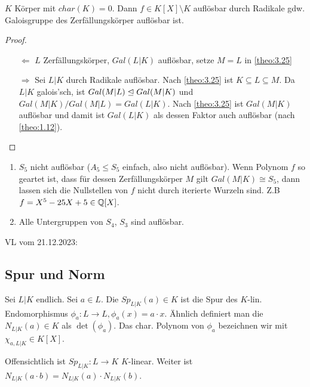 \documentclass[../main.tex]{subfiles}
\begin{document}
\begin{corollary}
    $K$ Körper mit $char(K)=0$. Dann $f\in K[X]\setminus K$ auflösbar durch Radikale gdw. Galoisgruppe des Zerfällungskörper auflösbar ist.
\end{corollary}
\begin{proof} $ $
    \begin{itemize}
        \item[$\Leftarrow$]
        $L$ Zerfällungskörper, $Gal(L|K)$ auflösbar, setze $M=L$ in \ref{theo:3.25}
        \item[$\Rightarrow$]
        Sei $L|K$ durch Radikale auflösbar.
        Nach \ref{theo:3.25} ist $K\subseteq L \subseteq M$.
        Da $L|K$ galois'sch, ist $Gal(M|L)\trianglelefteq Gal(M|K)$ und $Gal(M|K)/Gal(M|L) = Gal(L|K)$.
        Nach \ref{theo:3.25} ist $Gal(M|K)$ auflösbar und damit ist $Gal(L|K)$ als dessen Faktor auch auflösbar (nach \ref{theo:1.12}).
    \end{itemize}
\end{proof}

\begin{example}
    \begin{enumerate}
        \item $S_5$ nicht auflösbar ($A_5 \leq S_5$ einfach, also nicht auflösbar).
        Wenn Polynom $f$ so geartet ist, dass für dessen Zerfällungskörper $M$  gilt $Gal(M|K) \cong S_5$, dann lassen sich die Nullstellen von $f$ nicht durch iterierte Wurzeln sind.
        Z.B $f=X^5-25X+5\in \mathbb{Q}[X]$.
        \item Alle Untergruppen von $S_4$, $S_3$ sind auflösbar.
    \end{enumerate}
\end{example}

\begin{flushright}
VL vom 21.12.2023:
\end{flushright}
\subsection{Spur und Norm}
\begin{definition}\label{theo:3.28}
    Sei $L|K$ endlich.
    Sei $a\in L$. Die  $Sp_{L|K}(a)\in K$ ist die Spur des $K$-lin. Endomorphismus $\phi_a:L\rightarrow L, \phi_a(x) = a\cdot x$.
    Ähnlich definiert man die  $N_{L|K}(a) \in K$ als $\det(\phi_a)$.
    Das char. Polynom von $\phi_a$ bezeichnen wir mit $\chi_{a,L
    |K}\in K[X]$.
\end{definition}
Offensichtlich ist $Sp_{L|K}:L\rightarrow K$ $K$-linear.
Weiter ist $N_{L|K}(a\cdot b) = N_{L|K}(a)\cdot N_{L|K}(b)$.
\end{document}
